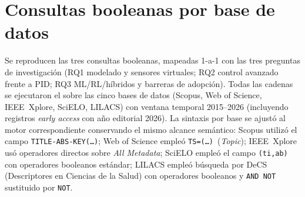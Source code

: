 
\clearpage
\nolinenumbers
\appendix
\renewcommand*{\appendixname}{Appendix}
\addto\captionsspanish{\renewcommand*{\appendixname}{Appendix}}
\titleformat{\section}{\normalsize\bfseries}{\appendixname~\thesection.}{1em}{}
\renewcommand{\thetable}{\thesection\arabic{table}}
\renewcommand{\thefigure}{\thesection\arabic{figure}}

\section{Consultas booleanas por base de datos}
\label{apx:queries_multibase}

Se reproducen las tres consultas booleanas, mapeadas 1-a-1 con las tres
preguntas de investigación (RQ1 modelado y sensores virtuales; RQ2 control
avanzado frente a PID; RQ3 ML/RL/híbridos y barreras de adopción). Todas
las cadenas se ejecutaron el \FechaBusqueda{} sobre las cinco bases
de datos (Scopus, Web of Science, IEEE~Xplore, SciELO, LILACS) con ventana
temporal 2015--2026 (incluyendo registros \textit{early access} con año
editorial 2026). La sintaxis por base se ajustó al motor correspondiente
conservando el mismo alcance semántico: Scopus utilizó el campo
\texttt{TITLE-ABS-KEY(\ldots)}; Web of Science empleó
\texttt{TS=(\ldots)}~(\textit{Topic}); IEEE~Xplore usó operadores
directos sobre \textit{All Metadata}; SciELO empleó el campo
\texttt{(ti,ab)} con operadores booleanos estándar; LILACS empleó
búsqueda por DeCS (Descriptores en Ciencias de la Salud) con operadores
booleanos y \texttt{AND NOT} sustituido por \texttt{NOT}.

